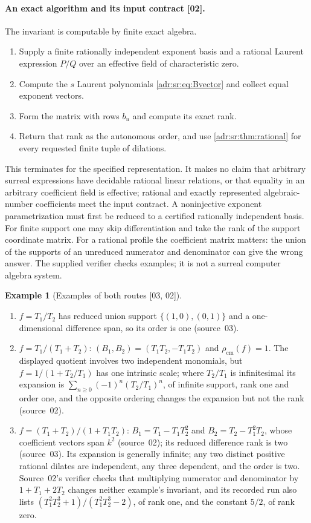 \documentclass[11pt,letterpaper]{article}
\numberwithin{equation}{section}
\theoremstyle{definition}
\newtheorem{example}[example]{Example}
\theoremstyle{remark}
\newcommand{\src}[1]{\textup{[#1]}}%
\begin{document}
\paragraph{An exact algorithm and its input contract \src{02}.}
The invariant is computable by finite exact algebra.
\begin{enumerate}[label=\arabic*.,leftmargin=2em]
\item Supply a finite rationally independent exponent basis and a rational
Laurent expression $P/Q$ over an effective field of characteristic zero.
\item Compute the $s$ Laurent polynomials \eqref{adr:sr:eq:Bvector} and
collect equal exponent vectors.
\item Form the matrix with rows $b_u$ and compute its exact rank.
\item Return that rank as the autonomous order, and use
\cref{adr:sr:thm:rational} for every requested finite tuple of dilations.
\end{enumerate}
This terminates for the specified representation. It makes no claim that
arbitrary surreal expressions have decidable rational linear relations, or
that equality in an arbitrary coefficient field is effective; rational and
exactly represented algebraic-number coefficients meet the input contract. A
noninjective exponent parametrization must first be reduced to a certified
rationally independent basis. For finite support one may skip differentiation
and take the rank of the support coordinate matrix. For a rational profile the
coefficient matrix matters: the union of the supports of an unreduced
numerator and denominator can give the wrong answer. The supplied verifier
checks examples; it is not a surreal computer algebra system.

\begin{example}[Examples of both routes \src{03, 02}]
\label{adr:sr:ex:rational}
\begin{enumerate}[label=(\alph*),leftmargin=2em,itemsep=2pt]
\item $f=T_1/T_2$ has reduced union support $\{(1,0),(0,1)\}$ and a
one-dimensional difference span, so its order is one (source~03).
\item $f=T_1/(T_1+T_2)$: $(B_1,B_2)=(T_1T_2,-T_1T_2)$ and
$\rho_{\mathrm{cm}}(f)=1$. The displayed quotient involves two independent
monomials, but $f=1/(1+T_2/T_1)$ has one intrinsic scale; where $T_2/T_1$ is
infinitesimal its expansion is $\sum_{n\ge0}(-1)^n(T_2/T_1)^n$, of infinite
support, rank one and order one, and the opposite ordering changes the
expansion but not the rank (source~02).
\item $f=(T_1+T_2)/(1+T_1T_2)$: $B_1=T_1-T_1T_2^2$ and $B_2=T_2-T_1^2T_2$, whose
coefficient vectors span $k^2$ (source~02); its reduced difference rank is two
(source~03). Its expansion is generally infinite; any two distinct positive
rational dilates are independent, any three dependent, and the order is two.
Source~02's verifier checks that multiplying numerator and denominator by
$1+T_1+2T_2$ changes neither example's invariant, and its recorded run also
lists $(T_1^2T_2^3+1)/(T_1^2T_2^3-2)$, of rank one, and the constant $5/2$, of
rank zero.
\end{enumerate}
\end{example}
\end{document}
